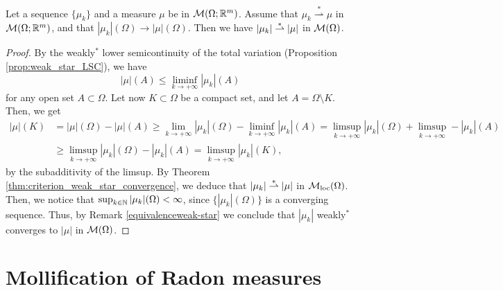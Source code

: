 \begin{proposition}
Let a sequence $\{\mu_{k}\}$ and a measure $\mu$ be in $\mathcal{M}(\Omega; \mathbb{R}^{m})$. Assume that $\mu_{k} \stackrel {*}{\rightharpoonup} \mu$ in $\mathcal{M}(\Omega; \mathbb{R}^{m})$, and that $|\mu_{k}|(\Omega) \to |\mu|(\Omega)$. Then we have $|\mu_{k}| \overset{*}{\rightharpoonup} |\mu|$ in $\mathcal{M}(\Omega)$.
\end{proposition}
\begin{proof}
By the weakly$^{*}$ lower semicontinuity of the total variation (Proposition \ref{prop:weak_star_LSC}), we have
\begin{equation*}
|\mu|(A) \le \liminf_{k \to + \infty} |\mu_{k}|(A)
\end{equation*}
for any open set $A \subset \Omega$. Let now $K \subset \Omega$ be a compact set, and let $A = \Omega \setminus K$. Then, we get
\begin{align*}
|\mu|(K) & = |\mu|(\Omega) - |\mu|(A) \ge \lim_{k \to + \infty} |\mu_{k}|(\Omega)  - \liminf_{k \to + \infty} |\mu_{k}|(A) = \limsup_{k \to + \infty} |\mu_{k}|(\Omega) + \limsup_{k \to + \infty} - |\mu_{k}|(A) \\
& \ge \limsup_{k \to + \infty} |\mu_{k}|(\Omega) - |\mu_{k}|(A) = \limsup_{k \to + \infty} |\mu_{k}|(K),
\end{align*}
by the subadditivity of the limsup. By Theorem \ref{thm:criterion_weak_star_convergence}, we deduce that $|\mu_{k}| \overset{*}{\rightharpoonup} |\mu|$ in $\mathcal{M}_{\rm loc}(\Omega)$. Then, we notice that $\sup_{k \in \mathbb{N}} |\mu_{k}|(\Omega) < \infty$, since $\{ |\mu_{k}|(\Omega)\}$ is a converging sequence. Thus, by Remark \ref{equivalenceweak-star} we conclude that $|\mu_{k}|$ weakly$^{*}$ converges to $|\mu|$ in $\mathcal{M}(\Omega)$.
\end{proof}

\section{Mollification of Radon measures}


